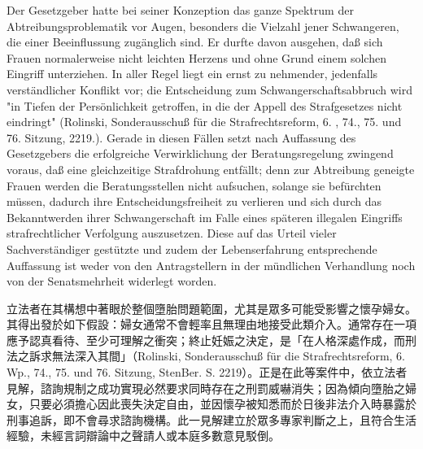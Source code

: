 \documentclass[12pt]{article}
\begin{document}
\syncleft
\begin{sourcepara}
Der Gesetzgeber hatte bei seiner Konzeption das ganze Spektrum der Abtreibungsproblematik vor Augen, besonders die Vielzahl jener Schwangeren, die einer Beeinflussung zugänglich sind. Er durfte davon ausgehen, daß sich Frauen normalerweise nicht leichten Herzens und ohne Grund einem solchen Eingriff unterziehen. In aller Regel liegt ein ernst zu nehmender, jedenfalls verständlicher Konflikt vor; die Entscheidung zum Schwangerschaftsabbruch wird "in Tiefen der Persönlichkeit getroffen, in die der Appell des Strafgesetzes nicht eindringt" (Rolinski, Sonderausschuß für die Strafrechtsreform, 6. \abbrWp{}, 74., 75. und 76. Sitzung, \abbrStenBer{} \abbrS{} 2219.). Gerade in diesen Fällen setzt nach Auffassung des Gesetzgebers die erfolgreiche Verwirklichung der Beratungsregelung zwingend voraus, daß eine gleichzeitige Strafdrohung entfällt; denn zur Abtreibung geneigte Frauen werden die Beratungsstellen nicht aufsuchen, solange sie befürchten müssen, dadurch ihre Entscheidungsfreiheit zu verlieren und sich durch das Bekanntwerden ihrer Schwangerschaft im Falle eines späteren illegalen Eingriffs strafrechtlicher Verfolgung auszusetzen. Diese auf das Urteil vieler Sachverständiger gestützte und zudem der Lebenserfahrung entsprechende Auffassung ist weder von den Antragstellern in der mündlichen Verhandlung noch von der Senatsmehrheit widerlegt worden.
\end{sourcepara}
\begin{transpara}
立法者在其構想中著眼於整個墮胎問題範圍，尤其是眾多可能受影響之懷孕婦女。其得出發於如下假設：婦女通常不會輕率且無理由地接受此類介入。通常存在一項應予認真看待、至少可理解之衝突；終止妊娠之決定，是「在人格深處作成，而刑法之訴求無法深入其間」（Rolinski, Sonderausschuß für die Strafrechtsreform, 6. Wp., 74., 75. und 76. Sitzung, StenBer. S. 2219）。正是在此等案件中，依立法者見解，諮詢規制之成功實現必然要求同時存在之刑罰威嚇消失；因為傾向墮胎之婦女，只要必須擔心因此喪失決定自由，並因懷孕被知悉而於日後非法介入時暴露於刑事追訴，即不會尋求諮詢機構。此一見解建立於眾多專家判斷之上，且符合生活經驗，未經言詞辯論中之聲請人或本庭多數意見駁倒。
\end{transpara}
\end{document}
